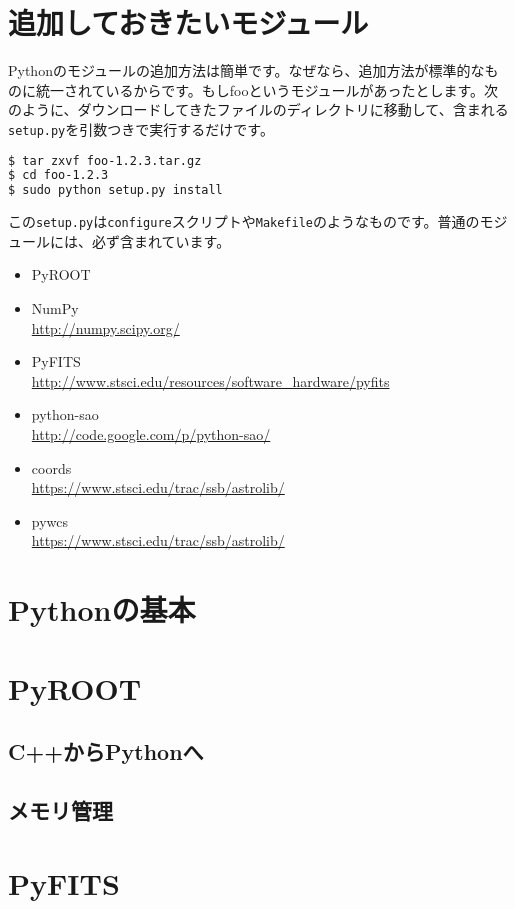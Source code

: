 \section{追加しておきたいモジュール}

Pythonのモジュールの追加方法は簡単です。なぜなら、追加方法が標準的なものに統一されているからです。もしfooというモジュールがあったとします。次のように、ダウンロードしてきたファイルのディレクトリに移動して、含まれる\texttt{setup.py}を引数つきで実行するだけです。
\begin{lstlisting}[language=bash]
$ tar zxvf foo-1.2.3.tar.gz
$ cd foo-1.2.3
$ sudo python setup.py install
\end{lstlisting}
この\texttt{setup.py}は\texttt{configure}スクリプトや\texttt{Makefile}のようなものです。普通のモジュールには、必ず含まれています。

\begin{itemize}
  \item PyROOT
  \item NumPy\\\url{http://numpy.scipy.org/}
  \item PyFITS\\\url{http://www.stsci.edu/resources/software_hardware/pyfits}
  \item python-sao\\\url{http://code.google.com/p/python-sao/}
  \item coords\\\url{https://www.stsci.edu/trac/ssb/astrolib/}
  \item pywcs\\\url{https://www.stsci.edu/trac/ssb/astrolib/}
\end{itemize}

\section{Pythonの基本}

\section{PyROOT}

\subsection{C++からPythonへ}

\subsection{メモリ管理}

\section{PyFITS}
